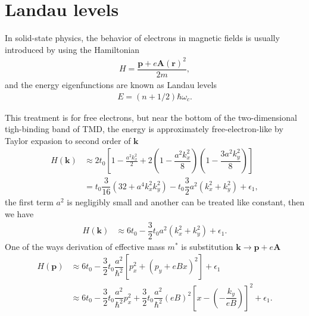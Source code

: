 \documentclass{report}
\newcommand{\f}[2]{\dfrac{#1}{#2}}
\begin{document}
\section{Landau levels}
In solid-state physics, the behavior of electrons in magnetic fields is usually introduced by using the Hamiltonian
\begin{gather}
	H = \f{\mathbf{p} + e \mathbf{A}(\mathbf{r})^{2}}{2m} ,
\end{gather}
and the energy eigenfunctions are known as Landau levels
\begin{gather}
	E = \left(n + 1/2\right) \hbar \omega_{c}.
\end{gather}

This treatment is for free electrons, \cite{10.1119/1.1615568} but near the bottom of the two-dimensional tigh-binding band of TMD, the energy is approximately free-electron-like by Taylor expasion to second order of $\mathbf{k}$
\begin{equation}
	\begin{aligned}
		H(\mathbf{k})
		 & \approx 2 t_{0} \left[1 - \frac{a^{2} k_{x}^{2}}{2} + 2\left(1 - \f{a^{2} k_{x}^{2}}{8}\right)\left(1 - \f{3a^{2} k_{y}^{2}}{8}\right)\right] \\
		 & = t_{0} \f{3}{16} \left(32 + a^{4} k_{x}^{2} k_{y}^{2}\right) - t_{0} \f{3}{2} a^{2}\left(k_{x}^{2} + k_{y}^{2}\right) + \epsilon_{1} ,
	\end{aligned}
\end{equation}
the first term $a^{2}$ is negligibly small and another can be treated like constant, then we have
\begin{equation}
	\begin{aligned}
		H(\mathbf{k})
		 & \approx 6 t_{0} - \f{3}{2} t_{0} a^{2} (k_{x}^{2} + k_{y}^{2}) + \epsilon_{1}.
	\end{aligned}
\end{equation}
One of the ways derivation of effective mass $m^{*}$ is substitution $\mathbf{k} \rightarrow \mathbf{p} + e \mathbf{A}$
\begin{equation}
	\begin{aligned}
		H(\mathbf{p})
		 & \approx 6 t_{0} - \f{3}{2} t_{0} \f{a^{2}}{\hbar^{2}} \left[ p_{x}^{2} + \left(p_{y} + e B x\right)^{2}\right] + \epsilon_{1}                                                       \\
		 & \approx 6 t_{0} - \f{3}{2} t_{0} \f{a^{2}}{\hbar^{2}} p_{x}^{2} + \f{3}{2} t_{0} \f{a^{2}}{\hbar^{2}} (e B)^{2} \left[ x - \left(- \f{k_{y}}{eB}\right) \right]^{2} + \epsilon_{1}.
	\end{aligned}
\end{equation}
\end{document}
